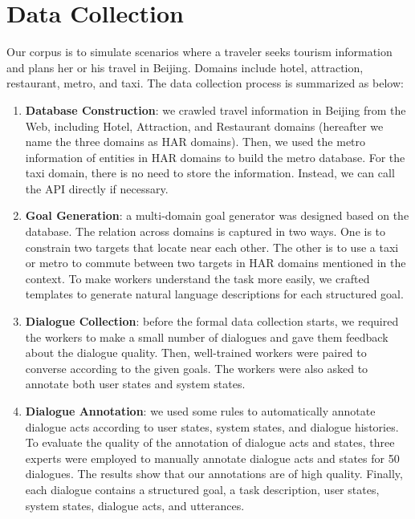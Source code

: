 \section{Data Collection}
Our corpus is to simulate scenarios where a traveler seeks tourism information and plans her or his travel in Beijing. Domains include hotel, attraction, restaurant, metro, and taxi.
The data collection process is summarized as below: 
\begin{enumerate}
    \item \textbf{Database Construction}: we crawled travel information in Beijing from the Web, including Hotel, Attraction, and Restaurant domains (hereafter we name the three domains as HAR domains). Then, we used the metro information of entities in HAR domains to build the metro database.
    For the taxi domain, there is no need to store the information. Instead, we can call the API directly if necessary.
    
    \item \textbf{Goal Generation}: a multi-domain goal generator was designed based on the database. The relation across domains is captured in two ways. One is to constrain two targets that locate near each other. The other is to use a taxi or metro to commute between two targets in HAR domains mentioned in the context. To make workers understand the task more easily, we crafted templates to generate natural language descriptions for each structured goal. 
    
    \item \textbf{Dialogue Collection}: before the formal data collection starts, we required the workers to make a small number of dialogues and gave them feedback about the dialogue quality. Then, well-trained workers were paired to converse according to the given goals. The workers were also asked to annotate both user states and system states.
    
    \item \textbf{Dialogue Annotation}: we used some rules to automatically annotate dialogue acts according to user states, system states, and dialogue histories. 
    To evaluate the quality of the annotation of dialogue acts and states, three experts were employed to manually annotate dialogue acts and states for 50 dialogues. The results show that our annotations are of high quality.
    Finally, each dialogue contains a structured goal, a task description, user states, system states, dialogue acts, and utterances. 

\end{enumerate}

